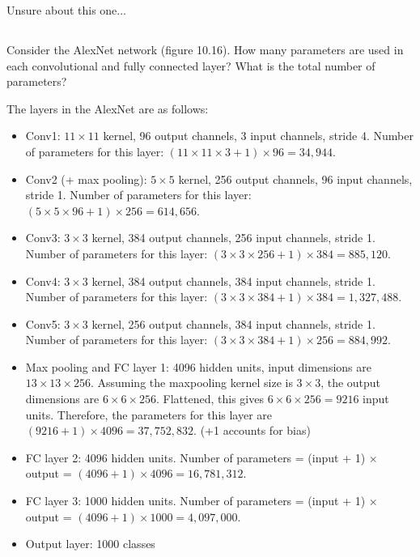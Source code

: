 \documentclass[12pt]{report}
\begin{document}
Unsure about this one...

\subsection{}
\begin{mdframed}
    Consider the AlexNet network (figure 10.16). How many parameters are used in each convolutional and fully connected layer? What is the total number of parameters?
\end{mdframed}

The layers in the AlexNet are as follows:

\begin{itemize}
    \item Conv1: $11\times11$ kernel, 96 output channels, 3 input channels, stride 4. Number of parameters for this layer: $(11\times11\times3+1)\times96 = 34,944$.
    \item Conv2 (+ max pooling): $5\times5$ kernel, 256 output channels, 96 input channels, stride 1. Number of parameters for this layer: $(5\times5\times96+1)\times256 = 614,656$.
    \item Conv3: $3\times3$ kernel, 384 output channels, 256 input channels, stride 1. Number of parameters for this layer: $(3\times3\times256+1)\times384 = 885,120$.
    \item Conv4: $3\times3$ kernel, 384 output channels, 384 input channels, stride 1. Number of parameters for this layer: $(3\times3\times384+1)\times384 = 1,327,488$.
    \item Conv5: $3\times3$ kernel, 256 output channels, 384 input channels, stride 1. Number of parameters for this layer: $(3\times3\times384+1)\times256 = 884,992$.
    \item Max pooling and FC layer 1: 4096 hidden units, input dimensions are $13\times13\times256$. Assuming the maxpooling kernel size is $3\times3$, the output dimensions are $6\times6\times256$. Flattened, this gives $6\times6\times256 = 9216$ input units. Therefore, the parameters for this layer are $(9216+1)\times4096 = 37,752,832$. (+1 accounts for bias)
    \item FC layer 2: 4096 hidden units. Number of parameters = (input + 1) $\times$ output = $(4096+1)\times4096 = 16,781,312$.
    \item FC layer 3: 1000 hidden units. Number of parameters = (input + 1) $\times$ output = $(4096+1)\times1000 = 4,097,000$.
    \item Output layer: 1000 classes
\end{itemize}
\end{document}
